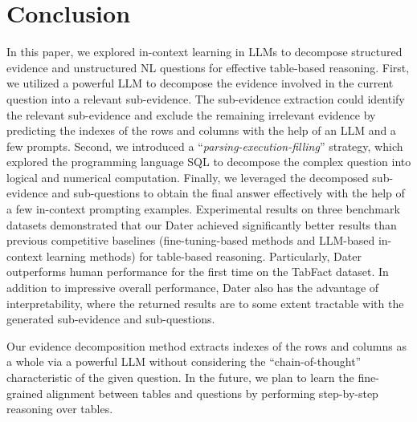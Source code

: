 \documentclass{article}
\begin{document}
\section{Conclusion}
In this paper, we explored in-context learning in LLMs to decompose structured evidence and unstructured NL questions for effective table-based reasoning. First, we utilized a powerful LLM to decompose the evidence involved in the current question into a relevant sub-evidence. The sub-evidence extraction could identify the relevant sub-evidence and exclude the remaining irrelevant evidence by predicting the indexes of the rows and columns with the help of an LLM and a few prompts.
Second, we introduced a ``\textit{parsing-execution-filling}'' strategy, which explored the programming language SQL to decompose the complex question into logical and numerical computation. 
Finally, we leveraged the decomposed sub-evidence and sub-questions to obtain the final answer effectively with the help of a few in-context prompting examples.   
Experimental results on three benchmark datasets demonstrated that our Dater achieved significantly better results than previous competitive baselines (fine-tuning-based methods and LLM-based in-context learning methods) for table-based reasoning. Particularly, Dater outperforms human performance for the first time on the TabFact dataset. In addition to impressive overall performance, Dater also has the advantage of interpretability, where the returned results are to some extent tractable with the generated sub-evidence and sub-questions. 

Our evidence decomposition method extracts indexes of the rows and columns as a whole via a powerful LLM without considering the ``chain-of-thought'' characteristic of the given question. In the future, we plan to learn the fine-grained alignment between tables and questions by performing step-by-step reasoning over tables.




\end{document}
